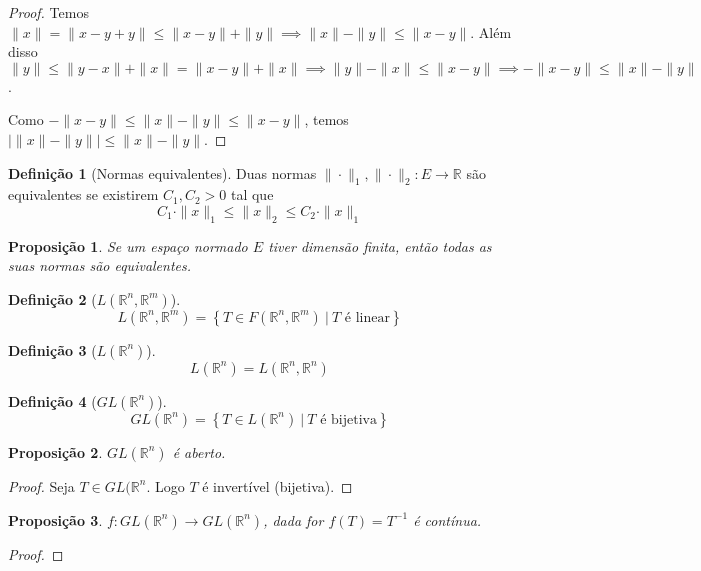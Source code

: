 \documentclass{article}
\theoremstyle{plain}
\newtheorem{prop}{Proposição}[section]
\theoremstyle{definition}
\newtheorem{definicao}{Definição}[section]
\theoremstyle{remark}
\begin{document}
\begin{proof}
	Temos $\| x\| = \| x-y +y\| \leq \|x-y\| +\|y\| \implies \| x\| - \|y\| \leq \| x-y\|$. Além disso $\|y\| \leq \|y-x\| + \|x\| = \|x-y\| +\|x\| \implies \|y\| -\|x\| \leq \| x-y\| \implies -\|x-y\| \leq \|x\| - \|y\|$.

	Como $-\|x-y\| \leq \|x\| - \|y\| \leq \|x-y\|$, temos $| \|x\| - \|y\| | \leq \|x\| -\|y\|$.

\end{proof}
\begin{definicao}[Normas equivalentes]
	Duas normas $\|\cdot \|_1, \| \cdot \|_2 : E \to \mathbb{R}$ são equivalentes se existirem $C_1,C_2 > 0$ tal que $$ C_1 \cdot \|x\|_1 \leq \|x\|_2 \leq C_2\cdot \| x\|_1 $$
\end{definicao}
\begin{prop}
	Se um espaço normado $E$ tiver dimensão finita, então todas as suas normas são equivalentes.
\end{prop}
\begin{definicao}[$L(\mathbb{R}^n, \mathbb{R}^m)$]
	$$L(\mathbb{R}^n, \mathbb{R}^m) = \left\{ T \in F(\mathbb{R}^n, \mathbb{R}^m) \: | \: T \text{ é linear}\right\}$$
\end{definicao}
\begin{definicao}[$L(\mathbb{R}^n)$]
	$$L(\mathbb{R}^n) = L(\mathbb{R}^n, \mathbb{R}^n)$$
\end{definicao}
\begin{definicao}[$GL(\mathbb{R}^n)$]
	$$GL(\mathbb{R}^n) = \left\{ T \in L(\mathbb{R}^n) \: | \: T \text{ é bijetiva}\right\}$$
\end{definicao}
\begin{prop}
	$GL(\mathbb{R}^n)$ é aberto.
\end{prop}
\begin{proof}
	Seja $T\in GL(\mathbb{R}^n$. Logo $T$ é  invertível (bijetiva). 
\end{proof}
\begin{prop}
	$f:GL(\mathbb{R}^n) \to GL(\mathbb{R}^n)$, dada for $f(T) = T^{-1}$ é contínua.
\end{prop}
\begin{proof}
\end{proof}
\end{document}
